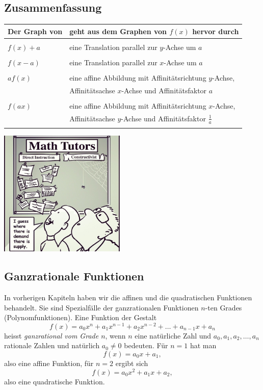 \documentclass[%
11pt,%
twoside,%
titlepage,%
german,%
headsepline%
]{scrartcl}
\begin{document}
  \subsection{Zusammenfassung}
  
  \begin{tabular}{l|l}
  Der Graph von  & geht aus dem Graphen von $f(x)$ hervor durch\\ \hline\\
  $f(x)+a$ & eine Translation parallel zur $y$-Achse um $a$\\ \\
  $f(x-a)$ & eine Translation parallel zur $x$-Achse um $a$\\ \\
  $af(x)$ & eine affine Abbildung mit Affinitätsrichtung $y$-Achse,\\ 
   & Affinitätsachse $x$-Achse und Affinitätsfaktor $a$\\ \\
  $f(ax)$ & eine affine Abbildung mit Affinitätsrichtung $x$-Achse,\\ 
   & Affinitätsachse $y$-Achse und Affinitätsfaktor $\frac{1}{a}$\\ \\
  \end{tabular}
 


\begin{center}
\includegraphics[width=0.45\textwidth]{pictures/math tutors}
\end{center}

\subsection{Ganzrationale Funktionen}
In vorherigen Kapiteln haben wir die affinen und die quadratischen Funktionen behandelt. Sie sind Spezialfälle der ganzrationalen Funktionen $n$-ten Grades (Polynomfunktionen).
Eine Funktion der Gestalt
$$f(x)=a_0x^n+ a_1x^{n-1} + a_2x^{n-2} + \dots + a_{n-1}x + a_n$$
heisst \emph{ganzrational vom Grade $n$}, wenn $n$ eine natürliche Zahl und $a_0, a_1, a_2,\dots, a_n$ rationale Zahlen und natürlich $a_0\neq0$  bedeuten.
Für $n=1$ hat man
$$f(x)=a_0x+a_1,$$
also eine affine Funktion, für $n=2$ ergibt sich
$$f(x)=a_0x^2+a_1x+a_2,$$
also eine quadratische Funktion.
\end{document}

